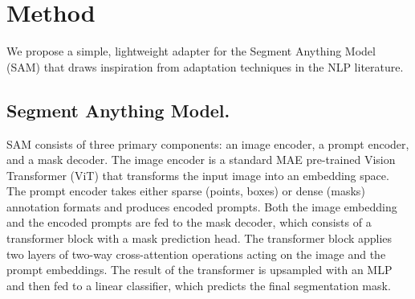 \section{Method}
\label{sec:method}
We propose a simple, lightweight adapter for the Segment Anything Model (SAM) that draws inspiration from adaptation techniques in the NLP literature. 


\subsection{Segment Anything Model.}
\label{sec:sam}
SAM consists of three primary components: an image encoder, a prompt encoder, and a mask decoder. The image encoder is a standard MAE pre-trained Vision Transformer (ViT) that transforms the input image into an embedding space. The prompt encoder takes either sparse (points, boxes) or dense (masks) annotation formats and produces encoded prompts. Both the image embedding and the encoded prompts are fed to the mask decoder, which consists of a transformer block with a mask prediction head. The transformer block applies two layers of two-way cross-attention operations acting on the image and the prompt embeddings. The result of the transformer is upsampled with an MLP and then fed to a linear classifier, which predicts the final segmentation mask.

